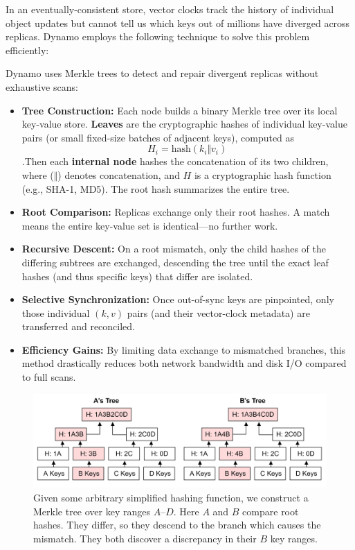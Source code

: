 \newpage
\noindent
In an eventually-consistent store, vector clocks track the history of individual object updates but cannot tell us which keys out of millions have diverged across replicas. Dynamo employs the following technique to solve this problem efficiently:
\begin{Def}

    Dynamo uses Merkle trees to detect and repair divergent replicas without exhaustive scans:
    
    \begin{itemize}
      \item \textbf{Tree Construction:} Each node builds a binary Merkle tree over its local key-value store.  \textbf{Leaves} are the cryptographic hashes of individual key-value pairs (or small fixed-size batches of adjacent keys), computed as 
      \[
        H_i = \text{hash}(k_i \Vert v_i)\,
      \]
      .Then each \textbf{internal node} hashes the concatenation of its two children,
      where ($\Vert$) denotes concatenation, and $H$ is a cryptographic hash function (e.g., SHA-1, MD5). The root hash summarizes the entire tree.
      \item \textbf{Root Comparison:} Replicas exchange only their root hashes.  A match means the entire key-value set is identical—no further work.
      \item \textbf{Recursive Descent:} On a root mismatch, only the child hashes of the differing subtrees are exchanged, descending the tree until the exact leaf hashes (and thus specific keys) that differ are isolated.
      \item \textbf{Selective Synchronization:} Once out-of-sync keys are pinpointed, only those individual $(k,v)$ pairs (and their vector-clock metadata) are transferred and reconciled.
      \item \textbf{Efficiency Gains:} By limiting data exchange to mismatched branches, this method drastically reduces both network bandwidth and disk I/O compared to full scans.
    \end{itemize}
    \end{Def}
    
\begin{figure}[h]
            
            \centering
            \includegraphics[width=.95\textwidth]{Sections/dyn/merkle.png}
            \caption{Given some arbitrary simplified hashing function, we construct a Merkle tree over key ranges $A$--$D$. Here $A$ and $B$ compare root hashes. They differ, so they descend to the branch 
            which causes the mismatch. They both discover a discrepancy in their $B$ key ranges.}
            \label{fig:merkle}
\end{figure}
